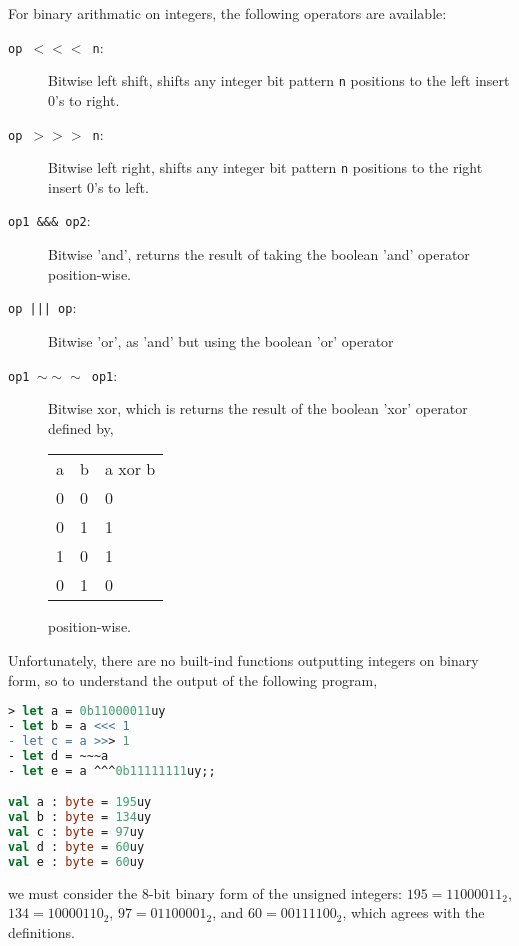 For binary arithmatic on integers, the following operators are available:
\begin{description}
\item[\texttt{op $<<<$ n}:] Bitwise left shift, shifts any integer bit pattern \lstinline|n| positions to the left insert 0's to right.
\item[\texttt{op $>>>$ n}:] Bitwise left right, shifts any integer bit pattern \lstinline|n| positions to the right insert 0's to left.
\item[\texttt{op1 \&\&\& op2}:] Bitwise 'and', returns the result of taking the boolean 'and' operator position-wise.
\item[\texttt{op ||| op}:] Bitwise 'or', as 'and' but using the boolean 'or' operator
\item[\texttt{op1 $\sim\sim\sim$ op1}:] Bitwise xor, which is returns the result of the boolean 'xor' operator defined by,
  \begin{center}
    \begin{tabular}{|l|l|l|}
      a&b& a xor b\\
      0 & 0 & 0\\
      0 & 1 & 1\\
      1 & 0 & 1\\
      0 & 1 & 0\\
    \end{tabular}
  \end{center}
position-wise. 
\end{description}
Unfortunately, there are no built-ind functions outputting integers on binary form, so to understand the output of the following program,
\begin{lstlisting}[language=fsharp,caption={fsharpi, the left most bit is interpreted differently for signed and unsigned integers, which gives rise to potential overflow errors.}]
> let a = 0b11000011uy  
- let b = a <<< 1
- let c = a >>> 1
- let d = ~~~a
- let e = a ^^^0b11111111uy;;

val a : byte = 195uy
val b : byte = 134uy
val c : byte = 97uy
val d : byte = 60uy
val e : byte = 60uy
\end{lstlisting}
we must consider the 8-bit binary form of the unsigned integers: $195 = 11000011_2$, $134 = 10000110_2$, $97 = 01100001_2$, and $60 = 00111100_2$, which agrees with the definitions. 

